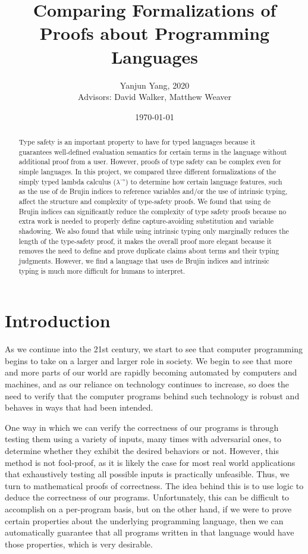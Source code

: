 \documentclass[12pt, letterpaper]{article}
\title{Comparing Formalizations of Proofs about Programming Languages}
\author{Yanjun Yang, 2020\\Advisors: David Walker, Matthew Weaver}
\date{\today}
\begin{document}
\doublespacing
\maketitle


\begin{abstract}
Type safety is an important property to have for typed languages because it guarantees well-defined evaluation semantics for certain terms in the language without additional proof from a user. However, proofs of type safety can be complex even for simple languages. In this project, we compared three different formalizations of the simply typed lambda calculus ($\lambda^{\to}$) to determine how certain language features, such as the use of de Brujin indices to reference variables and/or the use of intrinsic typing, affect the structure and complexity of type-safety proofs. We found that using de Brujin indices can significantly reduce the complexity of type safety proofs because no extra work is needed to properly define capture-avoiding substitution and variable shadowing. We also found that while using intrinsic typing only marginally reduces the length of the type-safety proof, it makes the overall proof more elegant because it removes the need to define and prove duplicate claims about terms and their typing judgments. However, we find a language that uses de Brujin indices and intrinsic typing is much more difficult for humans to interpret.
\end{abstract}

\section{Introduction}
As we continue into the 21st century, we start to see that computer programming begins to take on a larger and larger role in society. We begin to see that more and more parts of our world are rapidly becoming automated by computers and machines, and as our reliance on technology continues to increase, so does the need to verify that the computer programs behind such technology is robust and behaves in ways that had been intended.

One way in which we can verify the correctness of our programs is through testing them using a variety of inputs, many times with adversarial ones, to determine whether they exhibit the desired behaviors or not. However, this method is not fool-proof, as it is likely the case for most real world applications that exhaustively testing all possible inputs is practically unfeasible. Thus, we turn to mathematical proofs of correctness. The idea behind this is to use logic to deduce the correctness of our programs. Unfortunately, this can be difficult to accomplish on a per-program basis, but on the other hand, if we were to prove certain properties about the underlying programming language, then we can automatically guarantee that all programs written in that language would have those properties, which is very desirable. 
\end{document}
